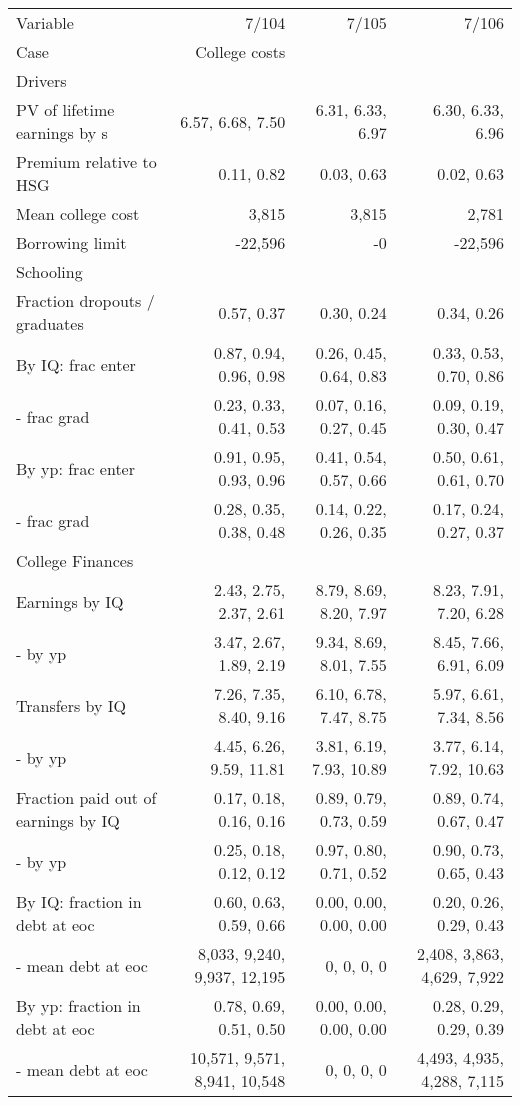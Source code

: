\begin{tabular}{lrrr}
\hline
Variable & 7/104  & 7/105  & 7/106  \\
Case & College costs  &   &   \\
Drivers &   &   &   \\
PV of lifetime earnings by s & 6.57, 6.68, 7.50  & 6.31, 6.33, 6.97  & 6.30, 6.33, 6.96  \\
Premium relative to HSG & 0.11, 0.82  & 0.03, 0.63  & 0.02, 0.63  \\
Mean college cost & 3,815  & 3,815  & 2,781  \\
Borrowing limit & -22,596  & -0  & -22,596  \\
\hline
Schooling &   &   &   \\
Fraction dropouts / graduates & 0.57, 0.37  & 0.30, 0.24  & 0.34, 0.26  \\
By IQ: frac enter & 0.87, 0.94, 0.96, 0.98  & 0.26, 0.45, 0.64, 0.83  & 0.33, 0.53, 0.70, 0.86  \\
- frac grad & 0.23, 0.33, 0.41, 0.53  & 0.07, 0.16, 0.27, 0.45  & 0.09, 0.19, 0.30, 0.47  \\
By yp: frac enter & 0.91, 0.95, 0.93, 0.96  & 0.41, 0.54, 0.57, 0.66  & 0.50, 0.61, 0.61, 0.70  \\
- frac grad & 0.28, 0.35, 0.38, 0.48  & 0.14, 0.22, 0.26, 0.35  & 0.17, 0.24, 0.27, 0.37  \\
\hline
College Finances &   &   &   \\
Earnings by IQ & 2.43, 2.75, 2.37, 2.61  & 8.79, 8.69, 8.20, 7.97  & 8.23, 7.91, 7.20, 6.28  \\
- by yp & 3.47, 2.67, 1.89, 2.19  & 9.34, 8.69, 8.01, 7.55  & 8.45, 7.66, 6.91, 6.09  \\
Transfers by IQ & 7.26, 7.35, 8.40, 9.16  & 6.10, 6.78, 7.47, 8.75  & 5.97, 6.61, 7.34, 8.56  \\
- by yp & 4.45, 6.26, 9.59, 11.81  & 3.81, 6.19, 7.93, 10.89  & 3.77, 6.14, 7.92, 10.63  \\
Fraction paid out of earnings by IQ & 0.17, 0.18, 0.16, 0.16  & 0.89, 0.79, 0.73, 0.59  & 0.89, 0.74, 0.67, 0.47  \\
- by yp & 0.25, 0.18, 0.12, 0.12  & 0.97, 0.80, 0.71, 0.52  & 0.90, 0.73, 0.65, 0.43  \\
By IQ: fraction in debt at eoc & 0.60, 0.63, 0.59, 0.66  & 0.00, 0.00, 0.00, 0.00  & 0.20, 0.26, 0.29, 0.43  \\
- mean debt at eoc & 8,033, 9,240, 9,937, 12,195  & 0, 0, 0, 0  & 2,408, 3,863, 4,629, 7,922  \\
By yp: fraction in debt at eoc & 0.78, 0.69, 0.51, 0.50  & 0.00, 0.00, 0.00, 0.00  & 0.28, 0.29, 0.29, 0.39  \\
- mean debt at eoc & 10,571, 9,571, 8,941, 10,548  & 0, 0, 0, 0  & 4,493, 4,935, 4,288, 7,115  \\
\hline
\end{tabular}%
